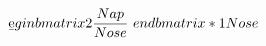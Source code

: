 \documentclass[preview]{standalone}
\begin{document}
\begin{align*}
\b e gin{bmatrix}   2   \frac{ N ap}{ N o s e }   \ e nd{bmatrix}   *   1   N o s e
\end{align*}
\end{document}

